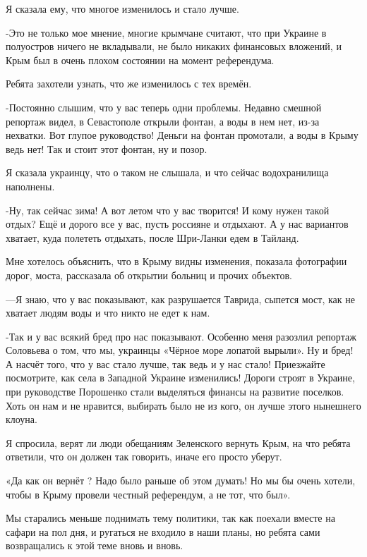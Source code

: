 Я сказала ему, что многое изменилось и стало лучше. 

-Это не только мое мнение, многие крымчане считают, что при Украине в
полуостров ничего не вкладывали, не было никаких финансовых вложений, и Крым
был в очень плохом состоянии на момент референдума.

Ребята захотели узнать, что же изменилось с тех времён.

-Постоянно слышим, что у вас теперь одни проблемы. Недавно смешной репортаж
видел, в Севастополе открыли фонтан, а воды в нем нет, из-за нехватки. Вот
глупое руководство! Деньги на фонтан промотали, а воды в Крыму ведь нет! Так и
стоит этот фонтан, ну и позор.

Я сказала украинцу, что о таком не слышала, и что сейчас водохранилища
наполнены.

-Ну, так сейчас зима! А вот летом что у вас творится! И кому нужен такой отдых?
Ещё и дорого все у вас, пусть россияне и отдыхают. А у нас вариантов хватает,
куда полететь отдыхать, после Шри-Ланки едем в Тайланд. 

Мне хотелось объяснить, что в Крыму видны изменения, показала фотографии дорог,
моста, рассказала об открытии больниц и прочих объектов. 

—Я знаю, что у вас показывают, как разрушается Таврида, сыпется мост, как не
хватает людям воды и что никто не едет к нам. 

-Так и у вас всякий бред про нас показывают. Особенно меня разозлил репортаж
Соловьева о том, что мы, украинцы «Чёрное море лопатой вырыли». Ну и бред! А
насчёт того, что у вас стало лучше, так ведь и у нас стало! Приезжайте
посмотрите, как села в Западной Украине изменились! Дороги строят в Украине,
при руководстве Порошенко стали выделяться финансы на развитие поселков. Хоть
он нам и не нравится, выбирать было не из кого, он лучше этого нынешнего
клоуна.

Я спросила, верят ли люди обещаниям Зеленского вернуть Крым, на что ребята
ответили, что он должен так говорить, иначе его просто уберут.

«Да как он вернёт ? Надо было раньше об этом думать! Но мы бы очень хотели,
чтобы в Крыму провели честный референдум, а не тот, что был».


Мы старались меньше поднимать тему политики, так как поехали вместе на сафари
на пол дня, и ругаться не входило в наши планы, но ребята сами возвращались к
этой теме вновь и вновь.

